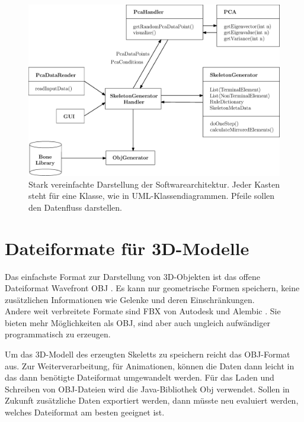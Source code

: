 \begin{figure}[ht]
 \includegraphics[width=\textwidth]{graphics/classDiagram}
 \caption{Stark vereinfachte Darstellung der Softwarearchitektur. Jeder Kasten steht für eine Klasse, wie in UML-Klassendiagrammen. Pfeile sollen den Datenfluss darstellen.}
 \label{classDiagram}
\end{figure}


\section{Dateiformate für 3D-Modelle}

Das einfachste Format zur Darstellung von 3D-Objekten ist das offene Dateiformat Wavefront OBJ \cite{obj}. Es kann nur geometrische Formen speichern, keine zusätzlichen Informationen wie \zb Gelenke und deren Einschränkungen.\\
Andere weit verbreitete Formate sind FBX von Autodesk \cite{fbx} und Alembic \cite{alembic}. Sie bieten mehr Möglichkeiten als OBJ, sind aber auch ungleich aufwändiger programmatisch zu erzeugen.

Um das 3D-Modell des erzeugten Skeletts zu speichern reicht das OBJ-Format aus. Zur Weiterverarbeitung, \zb für Animationen, können die Daten dann leicht in das dann benötigte Dateiformat umgewandelt werden. Für das Laden und Schreiben von OBJ-Dateien wird die Java-Bibliothek Obj \cite{ObjLoader} verwendet.
Sollen in Zukunft zusätzliche Daten exportiert werden, dann müsste neu evaluiert werden, welches Dateiformat am besten geeignet ist.




